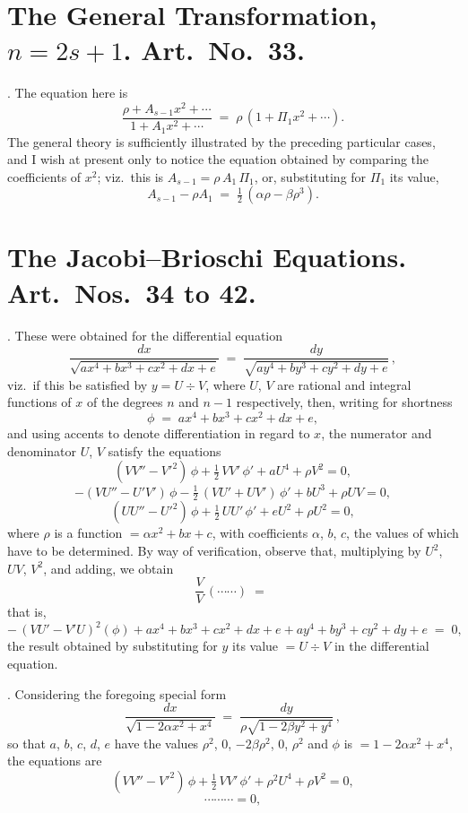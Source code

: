 \documentclass[11pt]{article}
\begin{document}
\newpage

\section*{The General Transformation, $n = 2s + 1$. Art.\ No.\ 33.}

. The equation here is
\[
\frac{\rho + A_{s-1}x^2 + \cdots}{1 + A_1 x^2 + \cdots} \;=\; \rho\,(1 + \Pi_1 x^2 + \cdots).
\]
The general theory is sufficiently illustrated by the preceding particular cases, and I wish at present only to notice the equation obtained by comparing the coefficients of $x^2$; viz.\ this is $A_{s-1} = \rho\,A_1\,\Pi_1$, or, substituting for $\Pi_1$ its value,
\[
A_{s-1} - \rho A_1 \;=\; \tfrac{1}{2}\,(\alpha\rho - \beta\rho^3).
\]

\bigskip

\section*{The Jacobi--Brioschi Equations. Art.\ Nos.\ 34 to 42.}

. These were obtained for the differential equation
\[
\frac{dx}{\sqrt{a x^4 + b x^3 + c x^2 + d x + e}} \;=\; \frac{dy}{\sqrt{a y^4 + b y^3 + c y^2 + d y + e}}\,,
\]
viz.\ if this be satisfied by $y = U \div V$, where $U$, $V$ are rational and integral functions of $x$ of the degrees $n$ and $n-1$ respectively, then, writing for shortness
\[
\phi \;=\; a x^4 + b x^3 + c x^2 + d x + e,
\]
and using accents to denote differentiation in regard to $x$, the numerator and denominator $U$, $V$ satisfy the equations
\[
(V V'' - V'^2)\,\phi + \tfrac{1}{2}\,V V'\,\phi' + a U^4 + \rho V^2 = 0,
\]
\[
-(V U'' - U'V')\,\phi - \tfrac{1}{2}\,(V U' + UV')\,\phi' + b U^3 + \rho UV = 0,
\]
\[
(U U'' - U'^2)\,\phi + \tfrac{1}{2}\,U U'\,\phi' + e U^2 + \rho U^2 = 0,
\]
where $\rho$ is a function $= \alpha x^2 + b x + c$, with coefficients $\alpha$, $b$, $c$, the values of which have to be determined. By way of verification, observe that, multiplying by $U^2$, $UV$, $V^2$, and adding, we obtain
\[
\frac{V}{V}\,(\cdots\cdots) \;=\;
\]
that is,
\[
-\,(V U' - V'U)^2(\phi) + a x^4 + b x^3 + c x^2 + d x + e + a y^4 + b y^3 + c y^2 + d y + e \;=\; 0,
\]
the result obtained by substituting for $y$ its value $= U \div V$ in the differential equation.

\medskip

. Considering the foregoing special form
\[
\frac{dx}{\sqrt{1 - 2\alpha x^2 + x^4}} \;=\; \frac{dy}{\rho\sqrt{1 - 2\beta y^2 + y^4}}\,,
\]
so that $a$, $b$, $c$, $d$, $e$ have the values $\rho^2$, $0$, $-2\beta\rho^2$, $0$, $\rho^2$ and $\phi$ is $= 1 - 2\alpha x^2 + x^4$, the equations are
\[
(V V'' - V'^2)\,\phi + \tfrac{1}{2}\,V V'\,\phi' + \rho^2 U^4 + \rho V^2 = 0,
\]
\[
\cdots\cdots\cdots = 0,
\]
\end{document}
